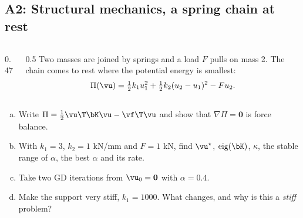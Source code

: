 \subsection{A2: Structural mechanics, a spring chain at rest}

\begin{frame}{}
  \begin{probbox}
    \begin{columns}[T]
      \begin{column}{0.47\textwidth}
        \centering
        
      \end{column}
      \begin{column}{0.5\textwidth}
        \small
        Two masses are joined by springs and a load $F$ pulls on mass 2. The chain comes to rest where the
        potential energy is smallest:
        \[
          \Pi(\vu) = \tfrac12k_1u_1^2 + \tfrac12k_2(u_2-u_1)^2 - Fu_2 .
        \]
      \end{column}
    \end{columns}
    \vspace{-2pt}
    \begin{enumerate}[(a)]
      \item Write $\Pi = \tfrac12\vu\T\bK\vu - \vf\T\vu$ and show that $\nabla\Pi = \mathbf 0$ is force balance.
      \item With $k_1 = 3$, $k_2 = 1$ kN/mm and $F = 1$ kN, find $\vu^\star$, $\operatorname{eig}(\bK)$, $\kappa$, the stable range of $\alpha$,
            the best $\alpha$ and its rate.
      \item Take two GD iterations from $\vu_0 = \mathbf 0$ with $\alpha = 0.4$.
      \item Make the support very stiff, $k_1 = 1000$. What changes, and why is this a \emph{stiff} problem?
    \end{enumerate}
  \end{probbox}
\end{frame}


